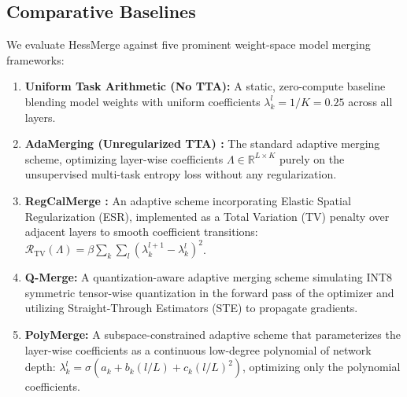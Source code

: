\subsection{Comparative Baselines}
We evaluate HessMerge against five prominent weight-space model merging frameworks:
\begin{enumerate}
    \item \textbf{Uniform Task Arithmetic (No TTA):} A static, zero-compute baseline blending model weights with uniform coefficients $\lambda_k^l = 1/K = 0.25$ across all layers.
    \item \textbf{AdaMerging (Unregularized TTA) \cite{adamerging}:} The standard adaptive merging scheme, optimizing layer-wise coefficients $\Lambda \in \mathbb{R}^{L \times K}$ purely on the unsupervised multi-task entropy loss without any regularization.
    \item \textbf{RegCalMerge \cite{zipmerge}:} An adaptive scheme incorporating Elastic Spatial Regularization (ESR), implemented as a Total Variation (TV) penalty over adjacent layers to smooth coefficient transitions: $\mathcal{R}_{\text{TV}}(\Lambda) = \beta \sum_k \sum_l (\lambda_k^{l+1} - \lambda_k^l)^2$.
    \item \textbf{Q-Merge:} A quantization-aware adaptive merging scheme simulating INT8 symmetric tensor-wise quantization in the forward pass of the optimizer and utilizing Straight-Through Estimators (STE) to propagate gradients.
    \item \textbf{PolyMerge:} A subspace-constrained adaptive scheme that parameterizes the layer-wise coefficients as a continuous low-degree polynomial of network depth: $\lambda_k^l = \sigma\left(a_k + b_k (l/L) + c_k (l/L)^2\right)$, optimizing only the polynomial coefficients.
\end{enumerate}


